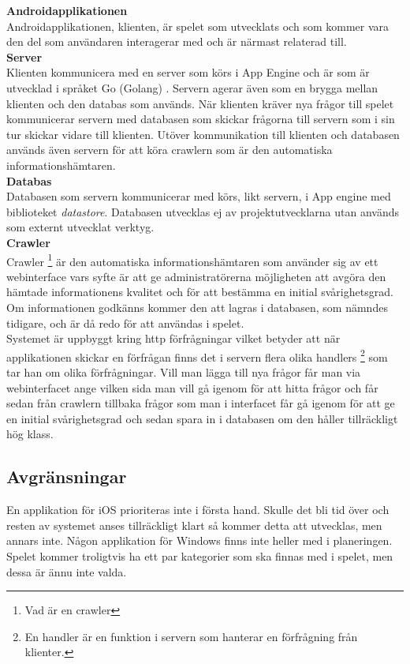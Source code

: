 \documentclass[12pt,a4paper]{article}
\begin{document}
\textbf{Androidapplikationen}\\
Androidapplikationen, klienten, är spelet som utvecklats och som kommer vara den del som användaren interagerar med och är närmast relaterad till. \\
\textbf{Server}\\
Klienten kommunicera med en server som körs i App Engine och är som är utvecklad i språket Go (Golang) \cite{golang}. Servern agerar även som en brygga mellan klienten och den databas som används. När klienten kräver nya frågor till spelet kommunicerar servern med databasen som skickar frågorna till servern som i sin tur skickar vidare till klienten. Utöver kommunikation till klienten och databasen används även servern för att köra crawlern som är den automatiska informationshämtaren. \\
\textbf{Databas}\\
Databasen som servern kommunicerar med körs, likt servern, i App engine med biblioteket \textit{datastore}. Databasen utvecklas ej av projektutvecklarna utan används som externt utvecklat verktyg. \\
\textbf{Crawler}\\
Crawler \footnote{Vad är en crawler} är den automatiska informationshämtaren som använder sig av ett webinterface vars syfte är att ge administratörerna möjligheten att avgöra den hämtade informationens kvalitet och för att bestämma en initial svårighetsgrad. Om informationen godkänns kommer den att lagras i databasen, som nämndes tidigare, och är då redo för att användas i spelet.
\\
Systemet är uppbyggt kring http förfrågningar vilket betyder att när applikationen skickar en förfrågan finns det i servern flera olika handlers \footnote{ En handler är en funktion i servern som hanterar en förfrågning från klienter.} som tar han om olika förfrågningar. Vill man lägga till nya frågor får man via webinterfacet ange vilken sida man vill gå igenom för att hitta frågor och får sedan från crawlern tillbaka frågor som man i interfacet får gå igenom för att ge en initial svårighetsgrad och sedan spara in i databasen om den håller tillräckligt hög klass.



\subsection{Avgränsningar}
En applikation för iOS prioriteras inte i första hand. Skulle det bli tid över och resten av systemet anses tillräckligt klart så kommer detta att utvecklas, men annars inte. Någon applikation för Windows finns inte heller med i planeringen. Spelet kommer troligtvis ha ett par kategorier som ska finnas med i spelet, men dessa är ännu inte valda.
\end{document}
